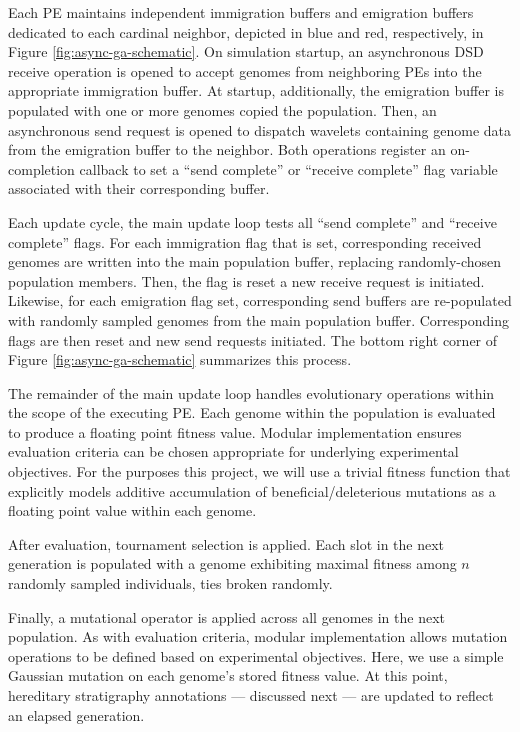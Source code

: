 Each PE maintains independent immigration buffers and emigration buffers dedicated to each cardinal neighbor, depicted in blue and red, respectively, in Figure \ref{fig:async-ga-schematic}.
On simulation startup, an asynchronous DSD receive operation is opened to accept genomes from neighboring PEs into the appropriate immigration buffer.
At startup, additionally, the emigration buffer is populated with one or more genomes copied the population.
Then, an asynchronous send request is opened to dispatch wavelets containing genome data from the emigration buffer to the neighbor.
Both operations register an on-completion callback to set a ``send complete'' or ``receive complete'' flag variable associated with their corresponding buffer.

Each update cycle, the main update loop tests all ``send complete'' and ``receive complete'' flags.
For each immigration flag that is set, corresponding received genomes are written into the main population buffer, replacing randomly-chosen population members.
Then, the flag is reset a new receive request is initiated.
Likewise, for each emigration flag set, corresponding send buffers are re-populated with randomly sampled genomes from the main population buffer.
Corresponding flags are then reset and new send requests initiated.
The bottom right corner of Figure \ref{fig:async-ga-schematic} summarizes this process.

The remainder of the main update loop handles evolutionary operations within the scope of the executing PE.
Each genome within the population is evaluated to produce a floating point fitness value.
Modular implementation ensures evaluation criteria can be chosen appropriate for underlying experimental objectives.
For the purposes this project, we will use a trivial fitness function that explicitly models additive accumulation of beneficial/deleterious mutations as a floating point value within each genome.

After evaluation, tournament selection is applied.
Each slot in the next generation is populated with a genome exhibiting maximal fitness among $n$ randomly sampled individuals, ties broken randomly.

Finally, a mutational operator is applied across all genomes in the next population.
As with evaluation criteria, modular implementation allows mutation operations to be defined based on experimental objectives.
Here, we use a simple Gaussian mutation on each genome's stored fitness value.
At this point, hereditary stratigraphy annotations --- discussed next --- are updated to reflect an elapsed generation.

